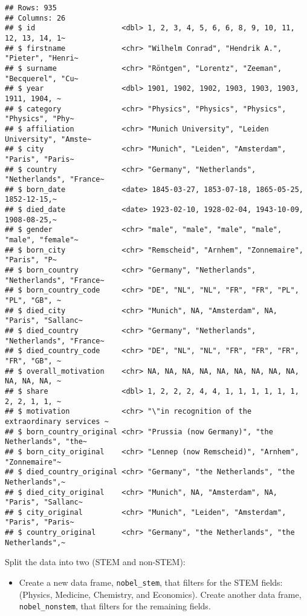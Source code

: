 \documentclass[
]{article}
\providecommand{\tightlist}{%
  \setlength{\itemsep}{0pt}\setlength{\parskip}{0pt}}
\begin{document}
\begin{verbatim}
## Rows: 935
## Columns: 26
## $ id                    <dbl> 1, 2, 3, 4, 5, 6, 6, 8, 9, 10, 11, 12, 13, 14, 1~
## $ firstname             <chr> "Wilhelm Conrad", "Hendrik A.", "Pieter", "Henri~
## $ surname               <chr> "Röntgen", "Lorentz", "Zeeman", "Becquerel", "Cu~
## $ year                  <dbl> 1901, 1902, 1902, 1903, 1903, 1903, 1911, 1904, ~
## $ category              <chr> "Physics", "Physics", "Physics", "Physics", "Phy~
## $ affiliation           <chr> "Munich University", "Leiden University", "Amste~
## $ city                  <chr> "Munich", "Leiden", "Amsterdam", "Paris", "Paris~
## $ country               <chr> "Germany", "Netherlands", "Netherlands", "France~
## $ born_date             <date> 1845-03-27, 1853-07-18, 1865-05-25, 1852-12-15,~
## $ died_date             <date> 1923-02-10, 1928-02-04, 1943-10-09, 1908-08-25,~
## $ gender                <chr> "male", "male", "male", "male", "male", "female"~
## $ born_city             <chr> "Remscheid", "Arnhem", "Zonnemaire", "Paris", "P~
## $ born_country          <chr> "Germany", "Netherlands", "Netherlands", "France~
## $ born_country_code     <chr> "DE", "NL", "NL", "FR", "FR", "PL", "PL", "GB", ~
## $ died_city             <chr> "Munich", NA, "Amsterdam", NA, "Paris", "Sallanc~
## $ died_country          <chr> "Germany", "Netherlands", "Netherlands", "France~
## $ died_country_code     <chr> "DE", "NL", "NL", "FR", "FR", "FR", "FR", "GB", ~
## $ overall_motivation    <chr> NA, NA, NA, NA, NA, NA, NA, NA, NA, NA, NA, NA, ~
## $ share                 <dbl> 1, 2, 2, 2, 4, 4, 1, 1, 1, 1, 1, 1, 2, 2, 1, 1, ~
## $ motivation            <chr> "\"in recognition of the extraordinary services ~
## $ born_country_original <chr> "Prussia (now Germany)", "the Netherlands", "the~
## $ born_city_original    <chr> "Lennep (now Remscheid)", "Arnhem", "Zonnemaire"~
## $ died_country_original <chr> "Germany", "the Netherlands", "the Netherlands",~
## $ died_city_original    <chr> "Munich", NA, "Amsterdam", NA, "Paris", "Sallanc~
## $ city_original         <chr> "Munich", "Leiden", "Amsterdam", "Paris", "Paris~
## $ country_original      <chr> "Germany", "the Netherlands", "the Netherlands",~
\end{verbatim}

Split the data into two (STEM and non-STEM):

\begin{itemize}
\tightlist
\item
  Create a new data frame, \texttt{nobel\_stem}, that filters for the
  STEM fields: (Physics, Medicine, Chemistry, and Economics). Create
  another data frame, \texttt{nobel\_nonstem}, that filters for the
  remaining fields.
\end{itemize}
\end{document}
